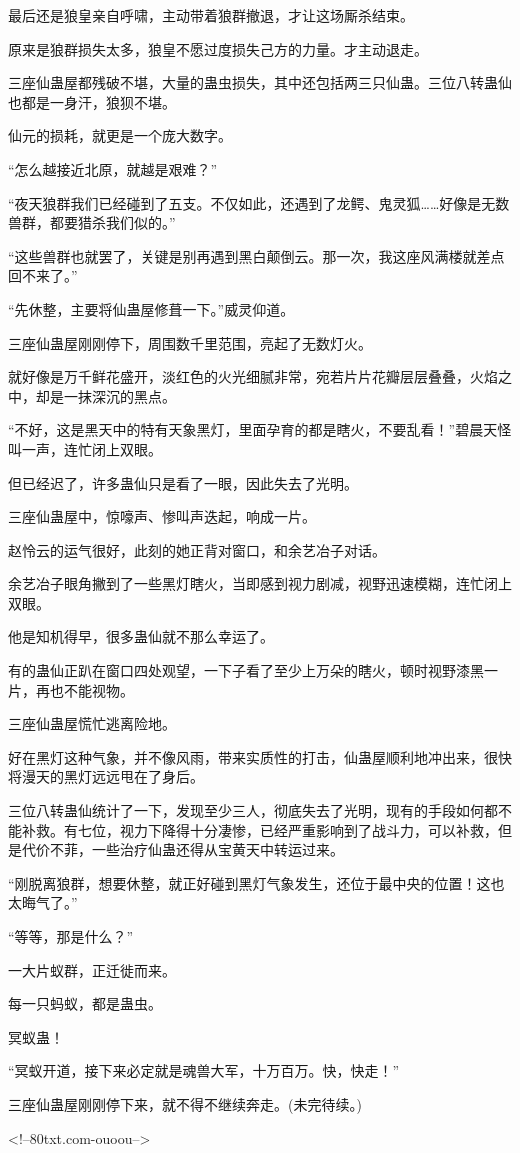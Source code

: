 \begin{this_body}
最后还是狼皇亲自呼啸，主动带着狼群撤退，才让这场厮杀结束。

原来是狼群损失太多，狼皇不愿过度损失己方的力量。才主动退走。

三座仙蛊屋都残破不堪，大量的蛊虫损失，其中还包括两三只仙蛊。三位八转蛊仙也都是一身汗，狼狈不堪。

仙元的损耗，就更是一个庞大数字。

“怎么越接近北原，就越是艰难？”

“夜天狼群我们已经碰到了五支。不仅如此，还遇到了龙鳄、鬼灵狐……好像是无数兽群，都要猎杀我们似的。”

“这些兽群也就罢了，关键是别再遇到黑白颠倒云。那一次，我这座风满楼就差点回不来了。”

“先休整，主要将仙蛊屋修葺一下。”威灵仰道。

三座仙蛊屋刚刚停下，周围数千里范围，亮起了无数灯火。

就好像是万千鲜花盛开，淡红色的火光细腻非常，宛若片片花瓣层层叠叠，火焰之中，却是一抹深沉的黑点。

“不好，这是黑天中的特有天象黑灯，里面孕育的都是瞎火，不要乱看！”碧晨天怪叫一声，连忙闭上双眼。

但已经迟了，许多蛊仙只是看了一眼，因此失去了光明。

三座仙蛊屋中，惊嚎声、惨叫声迭起，响成一片。

赵怜云的运气很好，此刻的她正背对窗口，和余艺冶子对话。

余艺冶子眼角撇到了一些黑灯瞎火，当即感到视力剧减，视野迅速模糊，连忙闭上双眼。

他是知机得早，很多蛊仙就不那么幸运了。

有的蛊仙正趴在窗口四处观望，一下子看了至少上万朵的瞎火，顿时视野漆黑一片，再也不能视物。

三座仙蛊屋慌忙逃离险地。

好在黑灯这种气象，并不像风雨，带来实质性的打击，仙蛊屋顺利地冲出来，很快将漫天的黑灯远远甩在了身后。

三位八转蛊仙统计了一下，发现至少三人，彻底失去了光明，现有的手段如何都不能补救。有七位，视力下降得十分凄惨，已经严重影响到了战斗力，可以补救，但是代价不菲，一些治疗仙蛊还得从宝黄天中转运过来。

“刚脱离狼群，想要休整，就正好碰到黑灯气象发生，还位于最中央的位置！这也太晦气了。”

“等等，那是什么？”

一大片蚁群，正迁徙而来。

每一只蚂蚁，都是蛊虫。

冥蚁蛊！

“冥蚁开道，接下来必定就是魂兽大军，十万百万。快，快走！”

三座仙蛊屋刚刚停下来，就不得不继续奔走。(未完待续。)

<!--80txt.com-ouoou-->

\end{this_body}

